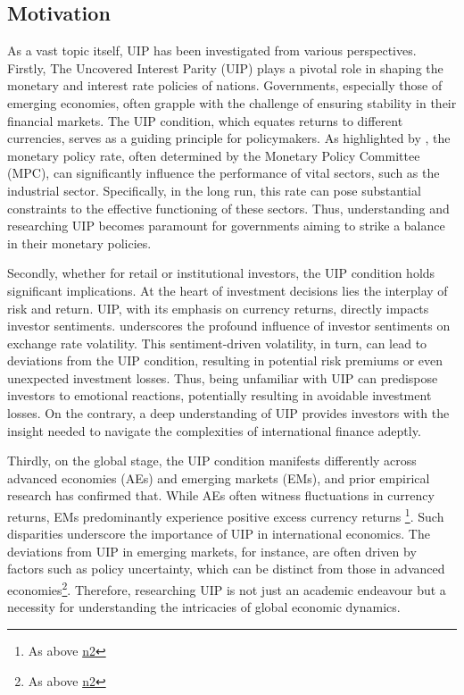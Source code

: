 \documentclass[10pt]{article}
\begin{document}
\subsection{Motivation}
As a vast topic itself, UIP has been investigated from various perspectives. Firstly, The Uncovered Interest Parity (UIP) plays a pivotal role in shaping the monetary and interest rate policies of nations. Governments, especially those of emerging economies, often grapple with the challenge of ensuring stability in their financial markets. The UIP condition, which equates returns to different currencies, serves as a guiding principle for policymakers. As highlighted by \cite{ozigbu2018interest}, the monetary policy rate, often determined by the Monetary Policy Committee (MPC), can significantly influence the performance of vital sectors, such as the industrial sector. Specifically, in the long run, this rate can pose substantial constraints to the effective functioning of these sectors. Thus, understanding and researching UIP becomes paramount for governments aiming to strike a balance in their monetary policies.

Secondly, whether for retail or institutional investors, the UIP condition holds significant implications. At the heart of investment decisions lies the interplay of risk and return. UIP, with its emphasis on currency returns, directly impacts investor sentiments. \cite{ur2013investor} underscores the profound influence of investor sentiments on exchange rate volatility. This sentiment-driven volatility, in turn, can lead to deviations from the UIP condition, resulting in potential risk premiums or even unexpected investment losses. Thus, being unfamiliar with UIP can predispose investors to emotional reactions, potentially resulting in avoidable investment losses. On the contrary, a deep understanding of UIP provides investors with the insight needed to navigate the complexities of international finance adeptly.

Thirdly, on the global stage, the UIP condition manifests differently across advanced economies (AEs) and emerging markets (EMs), and prior empirical research has confirmed that. While AEs often witness fluctuations in currency returns, EMs predominantly experience positive excess currency returns \footnote{As above \hyperref[kalemli2021five]{n2}}. Such disparities underscore the importance of UIP in international economics. The deviations from UIP in emerging markets, for instance, are often driven by factors such as policy uncertainty, which can be distinct from those in advanced economies\footnote{As above \hyperref[kalemli2021five]{n2}}. Therefore, researching UIP is not just an academic endeavour but a necessity for understanding the intricacies of global economic dynamics.
\end{document}
